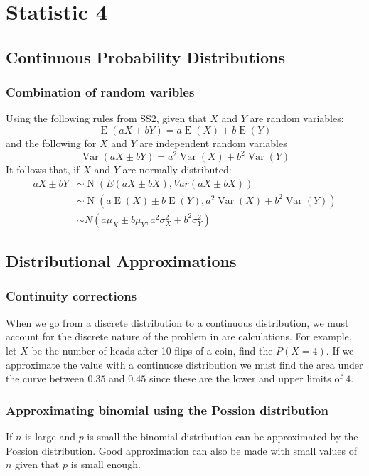 \chapter{Statistic 4}

\newpage
\section{Continuous Probability Distributions}

    \newpage
    \subsection{Combination of random varibles}
    Using the following rules from SS2, given that $X$ and $Y$ are random variables:
    $$\operatorname{E}(aX \pm bY) = a\operatorname{E}(X) \pm b\operatorname{E}(Y)$$
    and the following for $X$ and $Y$ are independent random variables
    $$
    \operatorname{Var}(aX \pm bY) = a^2\operatorname{Var}(X) + b^2\operatorname{Var}(Y)
    $$
    It follows that, if $X$ and $Y$ are normally distributed:
    \begin{align*}
    aX \pm bY &\sim \operatorname{N}(E(aX \pm bX), Var(aX \pm bX))\\
    &\sim \operatorname{N}(a\operatorname{E}(X) \pm b\operatorname{E}(Y), a^2\operatorname{Var}(X) + b^2\operatorname{Var}(Y))\\
    &\sim N(a \mu_X \pm b \mu_Y, a^2 \sigma_X^2 + b^2 \sigma_Y^2)
    \end{align*}

\newpage
\section{Distributional Approximations}

    \newpage
    \subsection{Continuity corrections}
        When we go from a discrete distribution to a continuous distribution, we must account for the discrete nature of the problem in are calculations. For example, let $X$ be the number of heads after 10 flips of a coin, find the $P(X = 4)$. If we approximate the value with a continuose distribution we must find the area under the curve between $0.35$ and $0.45$ since these are the lower and upper limits of $4$.

    \newpage
    \subsection{Approximating binomial using the Possion distribution}
        If $n$ is large and $p$ is small the binomial distribution can be approximated by the Possion distribution. Good approximation can also be made with small values of $n$ given that $p$ is small enough.
        
